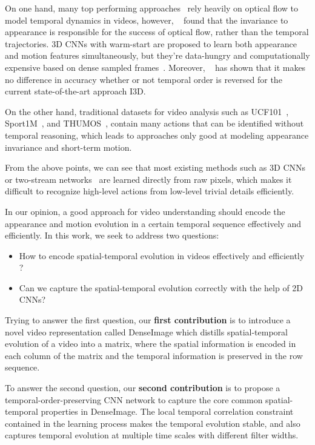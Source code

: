 \documentclass{article}
\begin{document}
On one hand, many top performing approaches~\cite{SimonyanZ14,WangXW0LTG16} rely heavily on optical flow to model temporal dynamics in videos, however, ~\cite{abs-1712-08416} found that the invariance to appearance is responsible for the success of optical flow, rather than the temporal trajectories. 3D CNNs with warm-start are proposed to learn both appearance and motion features simultaneously, but they're data-hungry and computationally expensive based on dense sampled frames~\cite{CarreiraZ17}. Moreover, ~\cite{abs-1712-04851} has shown that it makes no difference in accuracy whether or not temporal order is reversed for the current state-of-the-art approach I3D. 

On the other hand, traditional datasets for video analysis such as UCF101~\cite{abs-1212-0402}, Sport1M~\cite{KarpathyTSLSF14}, and THUMOS~\cite{jiang2014thumos}, contain many actions that can be identified without temporal reasoning, which leads to approaches only good at modeling appearance invariance and short-term motion.

From the above points, we can see that most existing methods such as 3D CNNs~\cite{TranBFTP15} or two-stream networks~\cite{SimonyanZ14} are learned directly from raw pixels, which makes it difficult to recognize high-level actions from low-level trivial details efficiently.

In our opinion, a good approach for video understanding should encode the appearance and motion evolution in a certain temporal sequence effectively and efficiently. In this work, we seek to address two questions:
\begin{itemize}
\item How to encode spatial-temporal evolution in videos effectively and efficiently ?
\item Can we capture the spatial-temporal evolution correctly with the help of 2D CNNs?
\end{itemize}

Trying to answer the first question, our \textbf{first contribution} is to introduce a novel video representation called DenseImage which distills spatial-temporal evolution of a video into a matrix, where the spatial information is encoded in each column of the matrix and the temporal information is preserved in the row sequence.

To answer the second question, our \textbf{second contribution} is to propose a temporal-order-preserving CNN network to capture the core common spatial-temporal properties in DenseImage. The local temporal correlation constraint contained in the learning process makes the temporal evolution stable, and also captures temporal evolution at multiple time scales with different filter widths.
\end{document}
